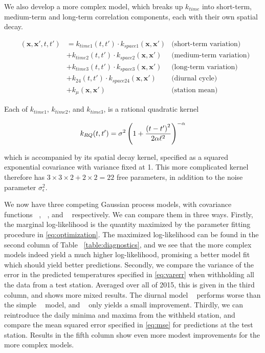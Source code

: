 \documentclass[letter]{article}
\newcommand{\genericdel}[3]{%
      \left#1#3\right#2
    }
\newcommand{\del}[1]{\genericdel(){#1}}
\newcommand{\xvec}{\mathbold{x}}
\newcommand{\sigman}{\sigma_{\epsilon}}
\DeclareMathOperator{\kSESE}{k_{\mathtt{SExSE}}}
\DeclareMathOperator{\kdiurn}{k_{\mathtt{SESE_{24}}}}
\DeclareMathOperator{\ksumprod}{k_{\mathtt{sumprod}}}
\newcommand{\eqlabel}[1]{\label{#1}}
\begin{document}
        We also develop a more complex model, which breaks up \(k_{time}\) into short-term, medium-term and long-term correlation components, each with their own spatial decay.

\begin{equation}
\eqlabel{eq:sumprod_kernel}
\begin{aligned}
    \ksumprod(\xvec,\xvec',t,t') &= 
           k_{time1}(t,t') \cdot k_{space1}(\xvec, \xvec')  &\text{(short-term variation)} \\
        &+ k_{time2}(t,t') \cdot k_{space2}(\xvec, \xvec')  &\text{(medium-term variation)} \\
        &+ k_{time3}(t,t') \cdot k_{space3}(\xvec, \xvec')  &\text{(long-term variation)} \\
        &+ k_{24}(t,t') \cdot k_{space24}(\xvec, \xvec') &\text{(diurnal cycle)} \\
        &+ k_\mu(\xvec, \xvec') &\text{(station mean)}
\end{aligned}
\end{equation}

Each of \(k_{time1}\), \(k_{time2}\), and \(k_{time3}\), is a rational quadratic kernel

\begin{equation}
    k_{RQ}(t,t') = \sigma^2 \del{1 + \frac{\del{t-t'}^2}{2\alpha\ell^2} }^{-\alpha}
\end{equation}

which is accompanied by its spatial decay kernel, specified as a squared exponential covariance with variance fixed at 1.
This more complicated kernel therefore has \(3 \times 3 \times 2 + 2 \times 2 = 22\) free parameters, in addition to the noise parameter \(\sigman^2\).

We now have three competing Gaussian process models, with covariance functions \(\kSESE\), \(\kdiurn\), and \(\ksumprod\) respectively. We can compare them in three ways.
Firstly, the marginal log-likelihood is the quantity maximized by the parameter fitting procedure in \eqref{eq:optimization}.
The maximized log-likelihood can be found in the second column of Table~ \ref{table:diagnostics}, and we see that the more complex models indeed yield a much higher log-likelihood, promising a better model fit which should yield better predictions.
Secondly, we compare the variance of the error in the predicted temperatures specified in \eqref{eq:varerr} when withholding all the data from a test station. Averaged over all of 2015, this is given in the third column, and shows more mixed results.
The diurnal model \(\kdiurn\) performs worse than the simple \(\kSESE\) model, and \(\ksumprod\) only yields a small improvement.
Thirdly, we can reintroduce the daily minima and maxima from the withheld station, and compare the mean squared error specified in \eqref{eq:mse} for predictions at the test station. Results in the fifth column show even more modest improvements for the more complex models.
\end{document}
